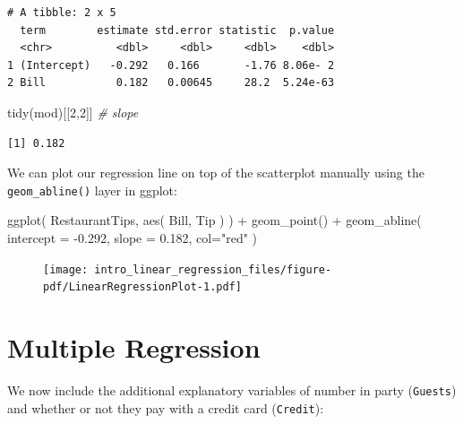 \documentclass[
  letterpaper,
  DIV=11,
  numbers=noendperiod]{scrreprt}
\newenvironment{Shaded}{\begin{snugshade}}{\end{snugshade}}
\newcommand{\AttributeTok}[1]{\textcolor[rgb]{0.49,0.56,0.16}{#1}}
\newcommand{\CommentTok}[1]{\textcolor[rgb]{0.38,0.63,0.69}{\textit{#1}}}
\newcommand{\DecValTok}[1]{\textcolor[rgb]{0.25,0.63,0.44}{#1}}
\newcommand{\FloatTok}[1]{\textcolor[rgb]{0.25,0.63,0.44}{#1}}
\newcommand{\FunctionTok}[1]{\textcolor[rgb]{0.02,0.16,0.49}{#1}}
\newcommand{\NormalTok}[1]{\textcolor[rgb]{0.00,0.44,0.13}{#1}}
\newcommand{\SpecialCharTok}[1]{\textcolor[rgb]{0.25,0.44,0.63}{#1}}
\newcommand{\StringTok}[1]{\textcolor[rgb]{0.25,0.44,0.63}{#1}}
\begin{document}
\begin{verbatim}
# A tibble: 2 x 5
  term        estimate std.error statistic  p.value
  <chr>          <dbl>     <dbl>     <dbl>    <dbl>
1 (Intercept)   -0.292   0.166       -1.76 8.06e- 2
2 Bill           0.182   0.00645     28.2  5.24e-63
\end{verbatim}

\begin{Shaded}
\begin{Highlighting}[]
\FunctionTok{tidy}\NormalTok{(mod)[[}\DecValTok{2}\NormalTok{,}\DecValTok{2}\NormalTok{]] }\CommentTok{\# slope}
\end{Highlighting}
\end{Shaded}

\begin{verbatim}
[1] 0.182
\end{verbatim}

We can plot our regression line on top of the scatterplot manually using
the \texttt{geom\_abline()} layer in ggplot:

\begin{Shaded}
\begin{Highlighting}[]
\FunctionTok{ggplot}\NormalTok{( RestaurantTips, }\FunctionTok{aes}\NormalTok{( Bill, Tip ) ) }\SpecialCharTok{+}
  \FunctionTok{geom\_point}\NormalTok{() }\SpecialCharTok{+}
  \FunctionTok{geom\_abline}\NormalTok{( }\AttributeTok{intercept =} \SpecialCharTok{{-}}\FloatTok{0.292}\NormalTok{, }\AttributeTok{slope =}  \FloatTok{0.182}\NormalTok{, }\AttributeTok{col=}\StringTok{"red"}\NormalTok{ )}
\end{Highlighting}
\end{Shaded}

\begin{figure}[H]

{\centering \texttt{[image: intro\_linear\_regression\_files/figure-pdf/LinearRegressionPlot-1.pdf]}

}

\end{figure}

\hypertarget{multiple-regression}{%
\section{Multiple Regression}\label{multiple-regression}}

We now include the additional explanatory variables of number in party
(\texttt{Guests}) and whether or not they pay with a credit card
(\texttt{Credit}):
\end{document}
